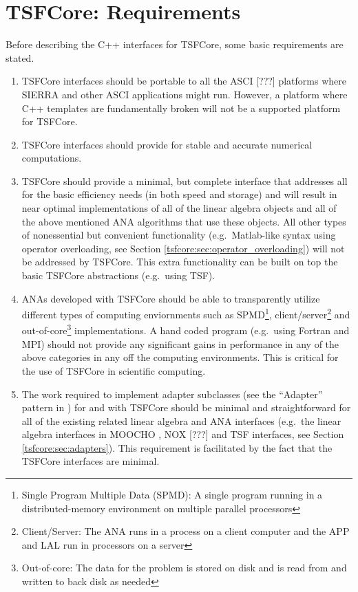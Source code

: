 \documentclass[10pt,fleqn]{article}
\begin{document}
%
\section{TSFCore: Requirements}
\label{tsfcore:sec:TSFCore_requirements}
%

Before describing the C++ interfaces for TSFCore, some basic
requirements are stated.

\begin{enumerate}

\item
TSFCore interfaces should be portable to all the ASCI [???]
platforms where SIERRA
\cite{ref:SIERRA} and other ASCI applications might run.  However, a
platform where C++ templates are fundamentally broken will not be a
supported platform for TSFCore.

\item
TSFCore interfaces should provide for stable and accurate numerical
computations.

\item
TSFCore should provide a minimal, but complete interface that
addresses all for the basic efficiency needs (in both speed and
storage) and will result in near optimal implementations of all of the
linear algebra objects and all of the above mentioned ANA algorithms
that use these objects.  All other types of nonessential but
convenient functionality (e.g.~Matlab-like syntax using operator
overloading, see Section \ref{tsfcore:sec:operator_overloading}) will
not be addressed by TSFCore.  This extra functionality can be built on
top the basic TSFCore abstractions (e.g.~using TSF).

\item
ANAs developed with TSFCore should be able to transparently utilize
different types of computing enviornments such as SPMD\footnote{Single
Program Multiple Data (SPMD): A single program running in a
distributed-memory environment on multiple parallel processors},
client/server\footnote{Client/Server: The ANA runs in a process on a
client computer and the APP and LAL run in processors on a server} and
out-of-core\footnote{Out-of-core: The data for the problem is stored
on disk and is read from and written to back disk as needed}
implementations.  A hand coded program (e.g.~using Fortran and MPI)
should not provide any significant gains in performance in any of the
above categories in any off the computing environments.  This is
critical for the use of TSFCore in scientific computing.

\item
The work required to implement adapter subclasses (see the ``Adapter''
pattern in \cite{ref:gama_et_al_1995}) for and with TSFCore should be
minimal and straightforward for all of the existing related linear
algebra and ANA interfaces (e.g.~the linear algebra interfaces in
MOOCHO \cite{ref:moochouserguide}, NOX [???] and TSF interfaces, see
Section \ref{tsfcore:sec:adapters}).  This requirement is facilitated
by the fact that the TSFCore interfaces are minimal.

\end{enumerate}
\end{document}
